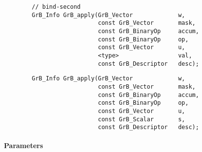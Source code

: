 \begin{verbatim}
        // bind-second
        GrB_Info GrB_apply(GrB_Vector             w,
                           const GrB_Vector       mask,
                           const GrB_BinaryOp     accum,
                           const GrB_BinaryOp     op,
                           const GrB_Vector       u,
                           <type>                 val,
                           const GrB_Descriptor   desc);
\end{verbatim}
                           
{\color{red}
\begin{verbatim}
        GrB_Info GrB_apply(GrB_Vector             w,
                           const GrB_Vector       mask,
                           const GrB_BinaryOp     accum,
                           const GrB_BinaryOp     op,
                           const GrB_Vector       u,
                           const GrB_Scalar       s,
                           const GrB_Descriptor   desc);
\end{verbatim}
}

\paragraph{Parameters}

